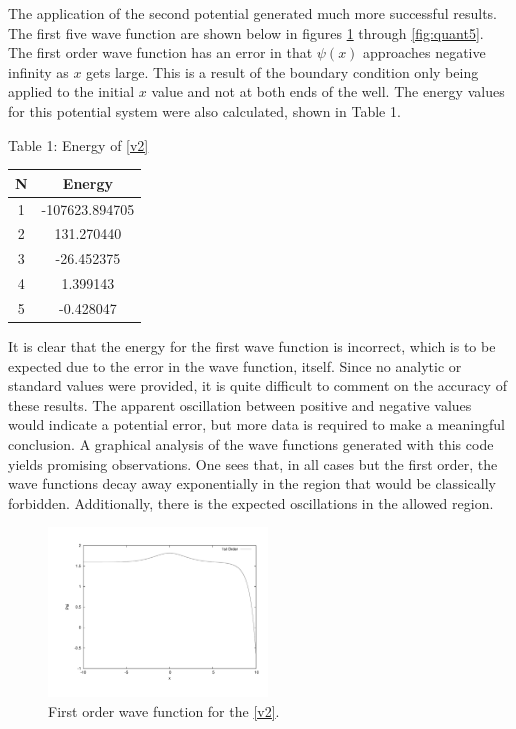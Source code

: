 \documentclass[12pt]{article}
\begin{document}
The application of the second potential generated much more successful results.  The first five wave function are shown below in figures \ref{fig:quant1} through \ref{fig:quant5}.  The first order wave function has an error in that $\psi(x)$ approaches negative infinity as $x$ gets large.  This is a result of the boundary condition only being applied to the initial $x$ value and not at both ends of the well.  The energy values for this potential system were also calculated, shown in Table 1.
\begin{center}
Table 1:  Energy of \eqref{v2} \\
\begin{tabular}{ | c | c |}
\hline
N & Energy \\ \hline
1&	-107623.894705 \\ \hline
2&	131.270440 \\ \hline
3&	-26.452375 \\ \hline
4&	1.399143 \\ \hline
5&	-0.428047 \\ \hline
\end{tabular}
\end{center}
It is clear that the energy for the first wave function is incorrect, which is to be expected due to the error in the wave function, itself.  Since no analytic or standard values were provided, it is quite difficult to comment on the accuracy of these results.  The apparent oscillation between positive and negative values would indicate a potential error, but more data is required to make a meaningful conclusion.  A graphical analysis of the wave functions generated with this code yields promising observations.  One sees that, in all cases but the first order, the wave functions decay away exponentially in the region that would be classically forbidden.  Additionally, there is the expected oscillations in the allowed region.
\begin{figure}[!h]
\centering
\includegraphics[width =110 mm, height = 45mm]{quantum_abs_1.pdf}
\caption{First order wave function for the \eqref{v2}.}
\label{fig:quant1}
\end{figure}
\end{document}
